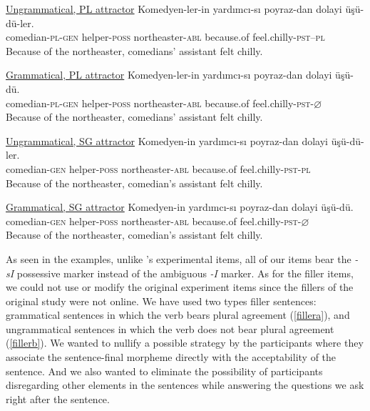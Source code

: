\documentclass[doc]{apa6}
\begin{document}
\begin{exe}
\ex
  \begin{xlist}
  \ex \underline{Ungrammatical, PL attractor} \label{exp3}
      \gll Komedyen-ler-in yard{\i}mc{\i}-s{\i} poyraz-dan dolayi \"{u}\c{s}\"{u}-d\"{u}-ler.\\
  comedian-\textsc{pl}-\textsc{gen} helper-\textsc{poss} northeaster-\textsc{abl} because.of feel.chilly-\textsc{pst}--\textsc{pl}\\
      \glt Because of the northeaster, comedians' assistant felt chilly.

  \ex \underline{Grammatical, PL attractor} \label{exp2}
      \gll Komedyen-ler-in yard{\i}mc{\i}-s{\i} poyraz-dan dolayi \"{u}\c{s}\"{u}-d\"{u}.\\
  comedian-\textsc{pl}-\textsc{gen} helper-\textsc{poss} northeaster-\textsc{abl} because.of feel.chilly-\textsc{pst}-$\varnothing$\\
      \glt Because of the northeaster, comedians' assistant felt chilly.

  
  \ex \underline{Ungrammatical, SG attractor} \label{exp4}
      \gll Komedyen-in yard{\i}mc{\i}-s{\i} poyraz-dan dolayi \"{u}\c{s}\"{u}-d\"{u}-ler.\\
  comedian-\textsc{gen} helper-\textsc{poss} northeaster-\textsc{abl} because.of feel.chilly-\textsc{pst}-\textsc{pl}\\
      \glt Because of the northeaster, comedian's assistant felt chilly.
  
  \ex \underline{Grammatical, SG attractor} \label{exp1}
      \gll Komedyen-in yard{\i}mc{\i}-s{\i} poyraz-dan dolayi \"{u}\c{s}\"{u}-d\"{u}.\\
  comedian-\textsc{gen} helper-\textsc{poss} northeaster-\textsc{abl} because.of feel.chilly-\textsc{pst}-$\varnothing$\\
      \glt Because of the northeaster, comedian's assistant felt chilly.

  \end{xlist}
\end{exe}

As seen in the examples, unlike \textcite{Lago2018}'s experimental items, all of our items bear the \emph{-sI} possessive marker instead of the ambiguous \emph{-I} marker. As for the filler items, we could not use or modify the original experiment items since the fillers of the original study were not online. We have used two types filler sentences: grammatical sentences in which the verb bears plural agreement (\autoref{fillera}), and ungrammatical sentences in which the verb does not bear plural agreement (\autoref{fillerb}). We wanted to nullify a possible strategy by the participants where they associate the sentence-final morpheme directly with the acceptability of the sentence. And we also wanted to eliminate the possibility of participants disregarding other elements in the sentences while answering the questions we ask right after the sentence.
\end{document}
